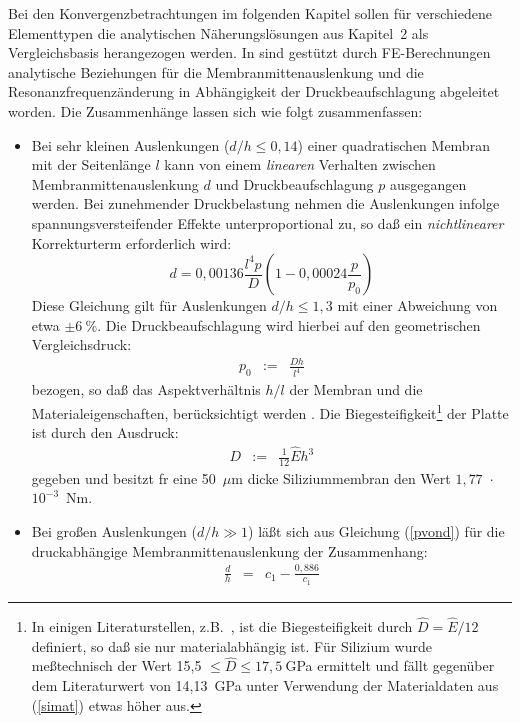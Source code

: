 Bei den Konvergenzbetrachtungen im folgenden Kapitel sollen für
verschiedene Elementtypen die analytischen Näherungslösungen
aus Kapitel~2 als Vergleichsbasis herangezogen werden.
In \cite{Fab92a, Sch92} sind gestützt durch FE-Berechnungen analytische
Beziehungen für die Membranmittenauslenkung und die
Resonanzfrequenzänderung in Abhängigkeit der Druckbeaufschlagung
abgeleitet worden. Die Zusammenhänge lassen sich wie folgt
zusammenfassen:
%
\begin{itemize}
\item Bei sehr kleinen Auslenkungen ($d/h \leq 0,14$) einer quadratischen
Membran mit der Seitenlänge $l$ kann von einem {\em linearen} Verhalten
zwischen
Membranmittenauslenkung $d$ und Druckbeaufschlagung $p$ ausgegangen werden.
Bei zunehmender Druckbelastung nehmen die Auslenkungen infolge
spannungsversteifender Effekte unterproportional zu, so daß ein
{\em nichtlinearer} Korrekturterm erforderlich wird:
\begin{equation}
\label{nonlin1}
 d = 0,00136 \frac{l^{4}p}{D} \left(1 - 0,00024 \frac{p}{p_{0}} \right)
\end{equation}
Diese Gleichung gilt für Auslenkungen $d/h \leq 1,3$ mit einer Abweichung
von etwa $\pm 6~\%$. Die Druckbeaufschlagung wird hierbei auf den
\glqq geometrischen Vergleichsdruck\grqq:
\begin{eqnarray}
\label{p0D}
 p_{0}   & := & \frac{Dh}{l^{4}} \nonumber
\end{eqnarray}
bezogen, so daß das Aspektverhältnis $h/l$ der Membran und die
Materialeigenschaften, berücksichtigt werden \cite{Pfe89}. Die
Biegesteifigkeit\footnote{In einigen Literaturstellen, z.B.\ \cite{Pon91},
ist
die Biegesteifigkeit durch $\hat D = \hat E/12$ definiert, so daß sie nur
materialabhängig ist. Für Silizium wurde meßtechnisch der Wert
15,5 $\le \hat D \le 17,5~$GPa ermittelt und fällt gegenüber dem
Literaturwert von 14,13~GPa unter Verwendung der Materialdaten aus
(\ref{simat}) etwas höher aus.} der Platte ist durch
den Ausdruck:
\begin{eqnarray}
\label{biegesteif}
 D & := & \frac{1}{12} \hat E h^{3}
\end{eqnarray}
gegeben und besitzt fr eine 50~$\mu$m dicke Siliziummembran
den Wert $1,77$~$\cdot$~$10^{-3}$~Nm.
%
\item Bei großen Auslenkungen ($d/h \gg 1$) läßt sich aus Gleichung
(\ref{pvond}) für die druckabhängige Membranmittenauslenkung der
Zusammenhang:
\begin{eqnarray}
\label{memausl}
 \frac{d}{h} & = & c_{1} - \frac{0,886}{c_{1}}

\end{eqnarray}
\end{itemize}
